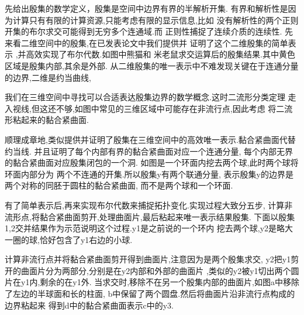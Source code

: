 \documentclass[UTF8]{ctexbeamer}	%
\theoremstyle{plain}
\theoremstyle{definition}
\theoremstyle{remark}
\numberwithin{equation}{section}
\begin{document}
\begin{frame}
  先给出殷集的数学定义，殷集是空间中边界有界的半解析开集.
  有界和解析性是因为计算只有有限的计算资源,只能考虑有限的显示信息,比如
  没有解析性的两个正则开集的布尔求交可能得到无穷多个连通域.而
  正则性捕捉了连续介质的连续性.
  先来看二维空间中的殷集,在已发表论文中我们提供并
  证明了这个二维殷集的简单表示
  ,并高效实现了布尔代数.如图中熊猫和
  米老鼠求交运算后的殷集结果.其中黄色区域是殷集内部,其余是外部.
  从二维殷集的唯一表示中不难发现关键在于连通分量的边界,二维是约当曲线,
\end{frame}

\begin{frame}
  我们在三维空间中寻找可以合适表达殷集边界的数学概念.这时二流形分类定理
  走入视线,但这还不够,如图中常见的三维区域中可能存在非流行点,因此考虑
  将二流形粘起来的黏合紧曲面.
\end{frame}

\begin{frame}
  顺理成章地,类似提供并证明了殷集在三维空间中的高效唯一表示.黏合紧曲面代替约当线.
  并且证明了每个内部有界的黏合紧曲面对应一个连通分量,
  每个内部无界的黏合紧曲面对应殷集闭包的一个洞.
  如图是一个环面内挖去两个球,此时两个球将环面内部分为
  两个不连通的开集.所以殷集y有两个联通分量,
  表示殷集y的边界是两个对称的同胚于圆柱的黏合紧曲面,
  而不是两个球和一个环面.
\end{frame}

\begin{frame}
  有了简单表示后,再来实现布尔代数来捕捉拓扑变化.实现过程大致分五步,
  计算非流形点,将黏合紧曲面剪开,处理曲面片,最后粘起来唯一表示结果殷集.
  下面以殷集1,2交并结果作为示范说明这个过程.y1是之前说的一个环内
  挖去两个球,y2是略大一圈的球,恰好包含了y1右边的小球.
\end{frame}

\begin{frame}
  计算非流行点并将黏合紧曲面剪开得到曲面片,注意因为是两个殷集求交,
  y2把y1剪开的曲面片分为两部分,分别是在y2内部和外部的曲面片
  ,类似的y2被y1切出两个圆片在y1内,剩余的在y1外.
  当求交时,移除不在另一个殷集内部的曲面片,如图a中移除了左边的半球面和长的柱面,
  b中保留了两个圆盘.然后将曲面片沿非流行点构成的边界粘起来
  得到d中的黏合紧曲面表示c中的y3.
\end{frame}
\end{document}
